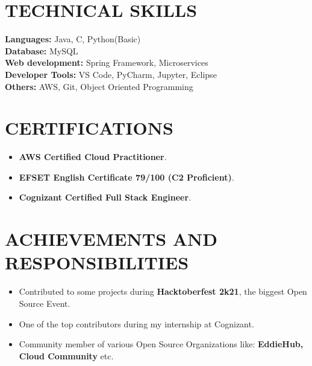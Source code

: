\documentclass[letterpaper,11pt]{article}
\newcommand{\resumeItem}[1]{
  \item\small{
    {#1 \vspace{-2pt}}
  }
}
\newcommand{\resumeSubHeadingListStart}{\begin{itemize}[leftmargin=0.0in, label={}]}
\newcommand{\resumeSubHeadingListEnd}{\end{itemize}}
\newcommand{\resumeItemListStart}{\begin{itemize}}
\newcommand{\resumeItemListEnd}{\end{itemize}\vspace{-5pt}}
\begin{document}
\section{TECHNICAL SKILLS}
 \begin{itemize}[leftmargin=0.15in, label={}]
    \small{\item{
     \textbf{\normalsize{Languages:}}{ \normalsize{Java, C, Python(Basic)}} \\
     \textbf{\normalsize{Database:}}{ \normalsize{MySQL}} \\
     \textbf{\normalsize{Web development:}}{ \normalsize{Spring Framework, Microservices}} \\
     \textbf{\normalsize{Developer Tools:}}{ \normalsize{VS Code, PyCharm, Jupyter, Eclipse}} \\
     \textbf{\normalsize{Others:}}{ \normalsize{AWS, Git, Object Oriented Programming}} \\
    }}
 \end{itemize}
 \vspace{-15pt}
 
\section{CERTIFICATIONS}
    \resumeSubHeadingListStart
            \resumeItemListStart
                \resumeItem{\normalsize{\textbf{AWS Certified Cloud Practitioner}. \href{https://www.credly.com/badges/e8c12dff-2690-48e9-9819-4525513ac063?source=linked_in_profile}{\raisebox{-0.1\height}\faExternalLink }}}
                
                \resumeItem{\normalsize{\textbf{EFSET English Certificate 79/100 (C2 Proficient)}. \href{https://www.efset.org/cert/6JyZKL}{\raisebox{-0.1\height}\faExternalLink }}}
                
                \resumeItem{\normalsize{\textbf{Cognizant Certified Full Stack Engineer}. \href{https://drive.google.com/drive/my-drive}{\raisebox{-0.1\height}\faExternalLink }}}
            \resumeItemListEnd
    \resumeSubHeadingListEnd
 \vspace{-11pt}

\section{ACHIEVEMENTS AND RESPONSIBILITIES}
    \resumeSubHeadingListStart
            \resumeItemListStart
                \resumeItem{\normalsize{Contributed to some projects during \textbf{Hacktoberfest 2k21}, the biggest Open Source Event.}}
                \resumeItem{\normalsize{One of the top contributors during my internship at Cognizant.}}
                \resumeItem{\normalsize{Community member of various Open Source Organizations like: \textbf{EddieHub, Cloud Community} etc.}}
            \resumeItemListEnd
    \resumeSubHeadingListEnd
 \vspace{-11pt}
\end{document}
